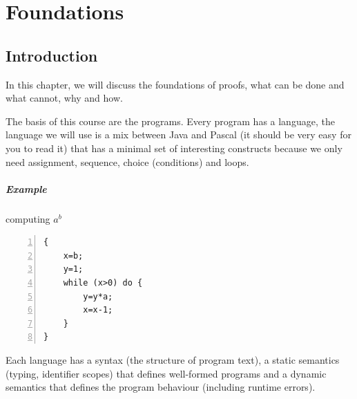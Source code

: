 \documentclass[12pt, a4paper]{book}
\begin{document}
  \chapter{Foundations}
  \label{chap:Foundations}

  \section{Introduction}
  \label{sec:Introduction}

In this chapter, we will discuss the foundations of proofs, what can be done
and what cannot, why and how. \newline

The basis of this course are the programs. Every program has a language, the
language we will use is a mix between Java and Pascal (it should be very
easy for you to read it) that has a minimal set of interesting constructs
because we only need assignment, sequence, choice (conditions) and loops.
\newline

\paragraph{Example} computing $a^b$
\begin{lstlisting}[numbers=left,caption={Example of code},label=code:basiccode]
{
    x=b;
    y=1;
    while (x>0) do {
        y=y*a;
        x=x-1;
    }
}
\end{lstlisting}

Each language has a syntax (the structure of program text), a static semantics
(typing, identifier scopes) that defines well-formed programs and a dynamic
semantics that defines the program behaviour (including runtime errors).
\newline
\end{document}
